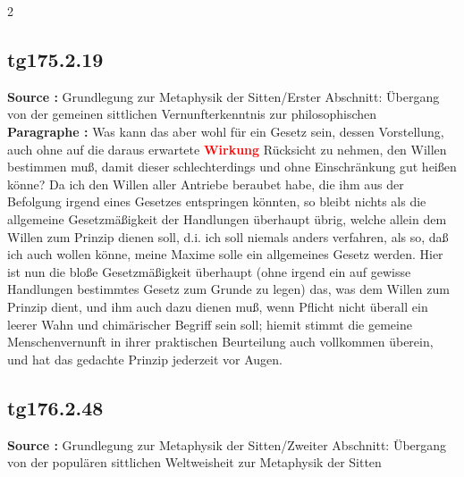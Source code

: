 \documentclass[a4paper,12pt,twoside]{book}
\newcommand{\match}[1]{\textcolor{red}{\textbf{#1}}}
\begin{document}
	
	2
	
	
	
	\subsection*{tg175.2.19} 
	\textbf{Source : }Grundlegung zur Metaphysik der Sitten/Erster Abschnitt: Übergang von der gemeinen sittlichen Vernunfterkenntnis zur philosophischen\\  
	
	\noindent\textbf{Paragraphe : }
	Was kann das aber wohl für ein Gesetz sein, dessen Vorstellung, auch ohne auf die daraus erwartete \match{Wirkung} Rücksicht zu nehmen, den Willen bestimmen muß, damit dieser schlechterdings und ohne Einschränkung gut heißen könne? Da ich den Willen aller Antriebe beraubet habe, die ihm aus der Befolgung irgend eines Gesetzes entspringen könnten, so bleibt nichts als die allgemeine Gesetzmäßigkeit der Handlungen überhaupt übrig, welche allein dem Willen zum Prinzip dienen soll, d.i. ich soll niemals anders verfahren, als so, daß ich auch wollen könne, meine Maxime solle ein allgemeines Gesetz werden. Hier ist nun die bloße Gesetzmäßigkeit überhaupt (ohne irgend ein auf gewisse Handlungen bestimmtes Gesetz zum Grunde zu legen) das, was dem Willen zum Prinzip dient, und ihm auch dazu dienen muß, wenn Pflicht nicht überall ein leerer Wahn und chimärischer Begriff sein soll; hiemit stimmt die  gemeine Menschenvernunft in ihrer praktischen Beurteilung auch vollkommen überein, und hat das gedachte Prinzip jederzeit vor Augen. 
	
	\subsection*{tg176.2.48} 
	\textbf{Source : }Grundlegung zur Metaphysik der Sitten/Zweiter Abschnitt: Übergang von der populären sittlichen Weltweisheit zur Metaphysik der Sitten\\  
	
\end{document}
